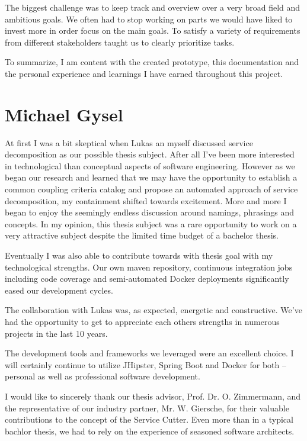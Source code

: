 The biggest challenge was to keep track and overview over a very broad field and ambitious goals. We often had to stop working on parts we would have liked to invest more in order focus on the main goals. To satisfy a variety of requirements from different stakeholders taught us to clearly prioritize tasks. 

To summarize, I am content with the created prototype, this documentation and the personal experience and learnings I have earned throughout this project. 


\section{Michael Gysel}

At first I was a bit skeptical when Lukas an myself discussed service decomposition as our  possible thesis subject. After all I've been more interested in technological than conceptual aspects of software engineering. However as we began our research and learned that we may have the opportunity to establish a common coupling criteria catalog and propose an automated approach of service decomposition, my containment shifted towards excitement. More and more I began to enjoy the seemingly endless discussion around namings, phrasings and concepts. In my opinion, this thesis subject was a rare opportunity to work on a very attractive subject despite the limited time budget of a bachelor thesis.

Eventually I was also able to contribute towards with thesis goal with my technological strengths. Our own maven repository, continuous integration jobs including code coverage and semi-automated Docker deployments significantly eased our development cycles.

The collaboration with Lukas was, as expected, energetic and constructive. We've had the opportunity to get to appreciate each others strengths in numerous projects in the last 10 years.

The development tools and frameworks we leveraged were an excellent choice. I will certainly continue to utilize JHipster, Spring Boot and Docker for both -- personal as well as professional software development.

I would like to sincerely thank our thesis advisor, Prof. Dr. O. Zimmermann, and the representative of our industry partner, Mr. W. Giersche, for their valuable contributions to the concept of the Service Cutter. Even more than in a typical bachlor thesis, we had to rely on the experience of seasoned software architects.